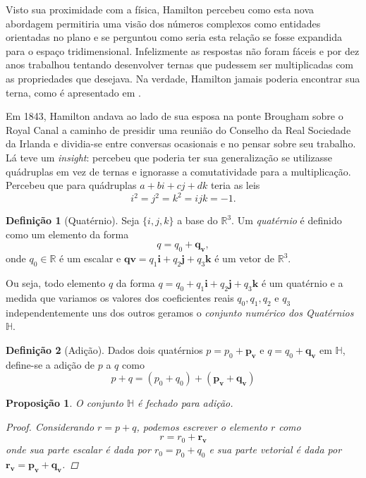 \documentclass[a4paper,12pt]{report}
\theoremstyle{plain}
\newtheorem{proposicao}{Proposição}[section]
\theoremstyle{definition}
\newtheorem{definicao}{Definição}[section]
\begin{document}
	Visto sua proximidade com a física, Hamilton percebeu como esta nova abordagem permitiria uma visão dos números complexos como entidades orientadas no plano e se perguntou como seria esta relação se fosse expandida para o espaço tridimensional. Infelizmente as respostas não foram fáceis e por dez anos trabalhou tentando desenvolver ternas  que pudessem ser multiplicadas com as propriedades que desejava. Na verdade, Hamilton jamais poderia encontrar sua terna, como é apresentado em \cite{lounestoClifford}. 
	
	Em 1843, Hamilton andava ao lado de sua esposa na ponte Brougham sobre o Royal Canal a caminho de presidir uma reunião do Conselho da Real Sociedade da Irlanda e dividia-se entre conversas ocasionais e no pensar sobre seu trabalho. Lá teve um \textit{insight}: percebeu que poderia ter sua generalização se utilizasse quádruplas em vez de ternas e ignorasse a comutatividade para a multiplicação. Percebeu que para quádruplas $a + bi + cj + dk$ teria as leis
	\begin{equation}\label{eq:quat}
		i^2 = j^2 = k^2 = ijk = -1.
	\end{equation}
	
	\begin{definicao}[Quatérnio]
		Seja $\{i,j,k\}$ a base do $\mathbb{R}^3$. Um \textit{quatérnio} é definido como um elemento da forma $$q=q_0+\mathbf{q_v},$$
		onde $q_0 \in \mathbb{R}$ é um escalar e $\mathbf{qv}=q_1\mathbf{i}+q_2\mathbf{j}+q_3\mathbf{k}$ é um vetor de $\mathbb{R}^3$.
	\end{definicao}
	
	Ou seja, todo elemento $q$ da forma $q = q_0 + q_1\textbf{i} + q_2\textbf{j} + q_3\textbf{k}$ é um quatérnio e a medida que variamos os valores dos coeficientes reais $q_0, q_1, q_2$ e $q_3$ independentemente uns dos outros geramos o \textit{conjunto numérico dos Quatérnios} $\mathbb{H}$. 
	
	\begin{definicao}[Adição]
		Dados dois quatérnios $p=p_0+\mathbf{p_v}$ e $q=q_0+\mathbf{q_v}$ em $\mathbb{H}$, define-se a adição de $p$ a $q$ como  
		$$p+q=(p_0+q_0)+(\mathbf{p_v}+\mathbf{q_v})$$
	\end{definicao}
	
	\begin{proposicao}
		O conjunto $\mathbb{H}$ é fechado para adição.
		\begin{proof}
			Considerando $r=p+q$, podemos escrever o elemento $r$ como
			$$r=r_0+\mathbf{r_v}$$
			onde sua parte escalar é dada por $r_0=p_0+q_0$ e sua parte vetorial é dada por $\mathbf{r_v=p_v+q_v}$.
		\end{proof}
	\end{proposicao}
\end{document}
